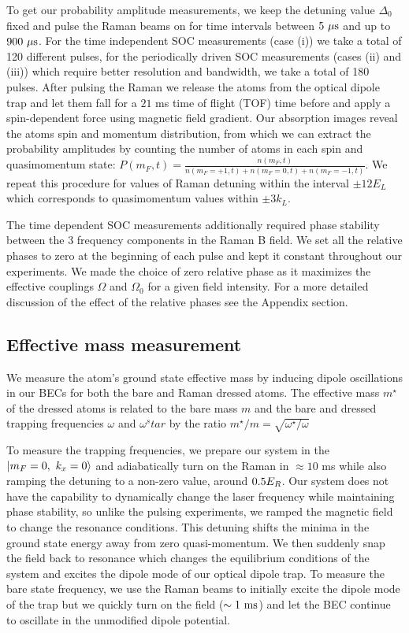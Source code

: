 To get our probability amplitude measurements, we keep the detuning value $\Delta_0$ fixed and pulse the Raman beams on for time intervals between $5{\ \mu{\rm s}}$ and up to $900{\ \mu{\rm s}}$. For the time independent SOC measurements (case (i)) we take a total of 120 different pulses, for the periodically driven SOC measurements (cases (ii) and (iii)) which require better resolution and bandwidth, we take a total of 180 pulses. After pulsing the Raman we release the atoms from the optical dipole trap and let them fall for a $21$ ms time of flight (TOF) time before and apply a spin-dependent force using magnetic field gradient. Our absorption images reveal the atoms spin and momentum distribution, from which we can extract the probability amplitudes by counting the number of atoms in each spin and quasimomentum state: $P(m_F,t)=\frac{n(m_F,t)}{n(m_F=+1,t) + n(m_F=0,t) + n(m_F=-1,t)}$.
We repeat this procedure for values of Raman detuning within the interval $\pm 12 E_L$ which corresponds to quasimomentum values within $\pm 3k_L$.

The time dependent SOC measurements additionally required phase stability between the 3 frequency components in the Raman B field. We set all the relative phases to zero at the beginning of each pulse and kept it constant throughout our experiments. We made the choice of zero relative phase as it maximizes the effective couplings $\Omega$ and $\Omega_0$ for a given field intensity. For a more detailed discussion of the effect of the relative phases see the Appendix section. 

\subsection{Effective mass measurement}

We measure the atom's ground state effective mass by inducing dipole oscillations in our BECs for both the bare and Raman dressed atoms. The effective mass $m^{\star}$ of the dressed atoms is related to the bare mass $m$ and the bare and dressed trapping frequencies $\omega$ and $\omega{^star}$ by the ratio $m^{\star}/m=\sqrt{\omega^{\star}/\omega}$

 To measure the trapping frequencies, we prepare our system in the  $|m_F=0,\ k_x=0\rangle$ and adiabatically turn on the Raman in $\approx10$ ms while also ramping the detuning to a non-zero value, around $0.5{{E_R}}$. Our system does not have the capability to dynamically change the laser frequency while maintaining phase stability, so unlike the pulsing experiments, we ramped the magnetic field to change the resonance conditions. This detuning shifts the minima in the ground state energy away from zero quasi-momentum. We then suddenly snap the field back to resonance which changes the equilibrium conditions of the system and excites the dipole mode of our optical dipole trap. To measure the bare state frequency, we use the Raman beams to initially excite the dipole mode of the trap but we quickly turn on the field ($\sim1{\ {\rm ms}}$) and let the BEC continue to oscillate in the unmodified dipole potential. 

